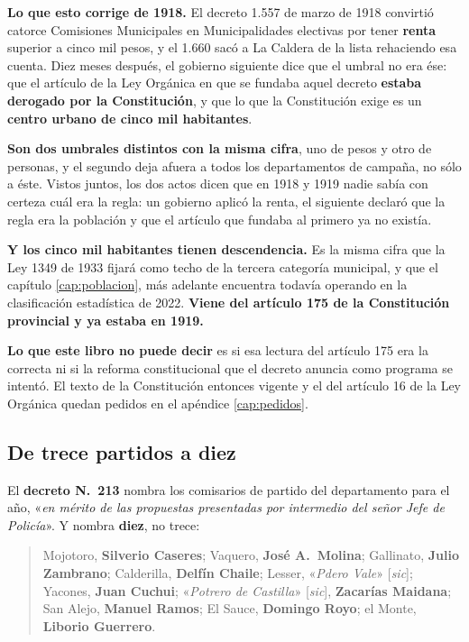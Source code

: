 \begin{cautela}
\textbf{Lo que esto corrige de 1918.} El decreto 1.557 de marzo de 1918 convirtió catorce
Comisiones Municipales en Municipalidades electivas por tener \textbf{renta} superior a cinco mil
pesos, y el 1.660 sacó a La Caldera de la lista rehaciendo esa cuenta. Diez meses después, el
gobierno siguiente dice que el umbral no era ése: que el artículo de la Ley Orgánica en que se
fundaba aquel decreto \textbf{estaba derogado por la Constitución}, y que lo que la Constitución
exige es un \textbf{centro urbano de cinco mil habitantes}.

\textbf{Son dos umbrales distintos con la misma cifra}, uno de pesos y otro de personas, y el
segundo deja afuera a todos los departamentos de campaña, no sólo a éste. Vistos juntos, los dos
actos dicen que en 1918 y 1919 nadie sabía con certeza cuál era la regla: un gobierno aplicó la
renta, el siguiente declaró que la regla era la población y que el artículo que fundaba al
primero ya no existía.

\textbf{Y los cinco mil habitantes tienen descendencia.} Es la misma cifra que la Ley 1349 de
1933 fijará como techo de la tercera categoría municipal, y que el capítulo \ref{cap:poblacion}, más adelante
encuentra todavía operando en la clasificación estadística de 2022. \textbf{Viene del artículo
175 de la Constitución provincial y ya estaba en 1919.}

\textbf{Lo que este libro no puede decir} es si esa lectura del artículo 175 era la correcta ni
si la reforma constitucional que el decreto anuncia como programa se intentó. El texto de la
Constitución entonces vigente y el del artículo 16 de la Ley Orgánica quedan pedidos en el
apéndice \ref{cap:pedidos}.
\end{cautela}

\subsection*{De trece partidos a diez}

El \textbf{decreto N.\ 213} nombra los comisarios de partido del departamento para el año, «\textit{en
mérito de las propuestas presentadas por intermedio del señor Jefe de Policía}». Y nombra
\textbf{diez}, no trece:

\begin{quote}
Mojotoro, \textbf{Silverio Caseres}; Vaquero, \textbf{José A.\ Molina}; Gallinato, \textbf{Julio
Zambrano}; Calderilla, \textbf{Delfín Chaile}; Lesser, «\textit{Pdero Vale}» [\textit{sic}];
Yacones, \textbf{Juan Cuchui}; «\textit{Potrero de Castilla}» [\textit{sic}], \textbf{Zacarías
Maidana}; San Alejo, \textbf{Manuel Ramos}; El Sauce, \textbf{Domingo Royo}; el Monte,
\textbf{Liborio Guerrero}.
\end{quote}

